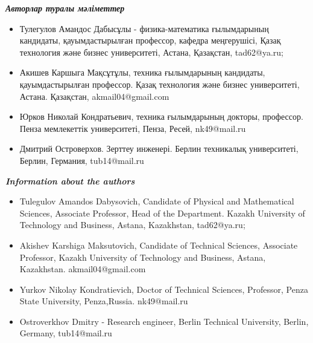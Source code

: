 \emph{{\bfseries Авторлар туралы мәліметтер}}

\begin{itemize}
\item
Тулегулов Амандос Дабысұлы - физика-математика ғылымдарының кандидаты,
қауымдастырылған профессор, кафедра меңгерушісі, Қазақ технология және
бизнес университеті, Астана, Қазақстан, tad62@ya.ru;

\item
Акишев Каршыга Мақсұтұлы, техника ғылымдарының кандидаты,
қауымдастырылған профессор. Қазақ технология және бизнес университеті,
Астана. Қазақстан,
akmail04@gmail.com

\item
Юрков Николай Кондратьевич, техника ғылымдарының докторы, профессор.
Пенза мемлекеттік университеті, Пенза, Ресей,
nk49@mail.ru

\item
Дмитрий Островерхов. Зерттеу инженері. Берлин техникалық университеті,
Берлин, Германия, tub14@mail.ru
\end{itemize}

\emph{{\bfseries Information about the authors}}

\begin{itemize}
\item
Tulegulov Amandos Dabysovich, Candidate of Physical and Mathematical
Sciences, Associate Professor, Head of the Department. Kazakh University
of Technology and Business, Astana, Kazakhstan, tad62@ya.ru;

\item
Akishev Karshiga Maksutovich, Candidate of Technical Sciences, Associate
Professor, Kazakh University of Technology and Business, Astana,
Kazakhstan.
akmail04@gmail.com

\item
Yurkov Nikolay Kondratievich, Doctor of Technical Sciences, Professor,
Penza State University, Penza,Russia. nk49@mail.ru

\item
Ostroverkhov Dmitry - Research engineer, Berlin Technical University,
Berlin, Germany, tub14@mail.ru
\end{itemize}
